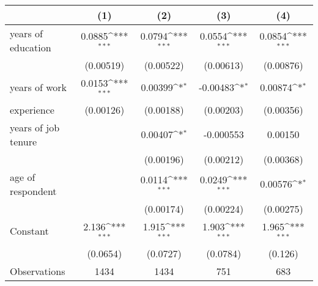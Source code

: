 \def\sym#1{\ifmmode^{#1}\else\(^{#1}\)\fi}
\begin{tabular}{l*{4}{c}}
\hline\hline
                    &\multicolumn{1}{c}{(1)}         &\multicolumn{1}{c}{(2)}         &\multicolumn{1}{c}{(3)}         &\multicolumn{1}{c}{(4)}         \\
\hline
years of education  &      0.0885\sym{***}&      0.0794\sym{***}&      0.0554\sym{***}&      0.0854\sym{***}\\
                    &   (0.00519)         &   (0.00522)         &   (0.00613)         &   (0.00876)         \\
[1em]
years of work       &      0.0153\sym{***}&     0.00399\sym{*}  &    -0.00483\sym{*}  &     0.00874\sym{*}  \\
experience          &   (0.00126)         &   (0.00188)         &   (0.00203)         &   (0.00356)         \\
[1em]
years of job tenure &                     &     0.00407\sym{*}  &   -0.000553         &     0.00150         \\
                    &                     &   (0.00196)         &   (0.00212)         &   (0.00368)         \\
[1em]
age of respondent   &                     &      0.0114\sym{***}&      0.0249\sym{***}&     0.00576\sym{*}  \\
                    &                     &   (0.00174)         &   (0.00224)         &   (0.00275)         \\
[1em]
Constant            &       2.136\sym{***}&       1.915\sym{***}&       1.903\sym{***}&       1.965\sym{***}\\
                    &    (0.0654)         &    (0.0727)         &    (0.0784)         &     (0.126)         \\
\hline
Observations        &        1434         &        1434         &         751         &         683         \\
\hline\hline
\end{tabular}